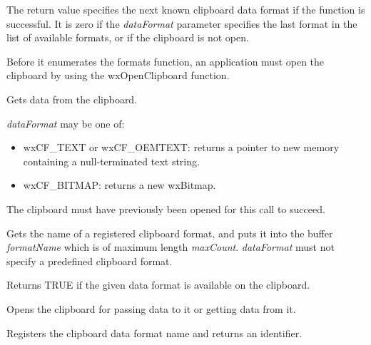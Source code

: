 The return value specifies the next known clipboard data format if the
function is successful. It is zero if the {\it dataFormat} parameter specifies
the last  format in the list of available formats, or if the clipboard
is not open.

Before it enumerates the formats function, an application must open the clipboard by using the
wxOpenClipboard function.



Gets data from the clipboard.

{\it dataFormat} may be one of:

\begin{itemize}\itemsep=0pt
\item wxCF\_TEXT or wxCF\_OEMTEXT: returns a pointer to new memory containing a null-terminated text string.
\item wxCF\_BITMAP: returns a new wxBitmap.
\end{itemize}

The clipboard must have previously been opened for this call to succeed.



Gets the name of a registered clipboard format, and puts it into the buffer {\it formatName} which is of maximum
length {\it maxCount}. {\it dataFormat} must not specify a predefined clipboard format.



Returns TRUE if the given data format is available on the clipboard.



Opens the clipboard for passing data to it or getting data from it.



Registers the clipboard data format name and returns an identifier.

